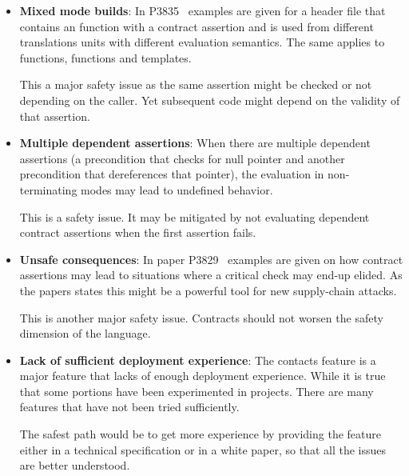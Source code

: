 \begin{itemize}
\item \textbf{Mixed mode builds}: In P3835~\cite{p3835r0} examples are given for
a header file that contains an  function with a contract assertion and is
used from different translations units with different evaluation semantics. The
same applies to  functions,  functions and
templates.

This a major safety issue as the same assertion might be checked or not
depending on the caller. Yet subsequent code might depend on the validity of
that assertion.

\item \textbf{Multiple dependent assertions}: When there are multiple dependent
assertions (a precondition that checks for null pointer and another precondition
that dereferences that pointer), the evaluation in non-terminating modes may
lead to undefined behavior.

This is a safety issue. It may be mitigated by not evaluating dependent contract
assertions when the first assertion fails.

\item \textbf{Unsafe consequences}: In paper P3829~\cite{p3829r0} examples are
given on how contract assertions may lead to situations where a critical check
may end-up elided. As the papers states this might be a powerful tool for new
supply-chain attacks.

This is another major safety issue. Contracts should not worsen the safety
dimension of the language.

\item \textbf{Lack of sufficient deployment experience}: The contacts feature is
a major feature that lacks of enough deployment experience. While it is true
that some portions have been experimented in projects. There are many features
that have not been tried sufficiently.

The safest path would be to get more experience by providing the feature either
in a technical specification or in a white paper, so that all the issues are
better understood.


\end{itemize}
